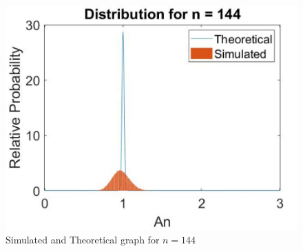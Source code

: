 \documentclass{article}
\begin{document}
\vspace*{1cm}
\begin{figure}[h!]
\centering
\includegraphics[scale=0.9]{Dpart1_3.jpg}
\caption{Simulated and Theoretical graph for $n = 144$}
\label{graph of $f(A_2)$}
\end{figure}

\newpage
\vspace*{1cm}
\end{document}
